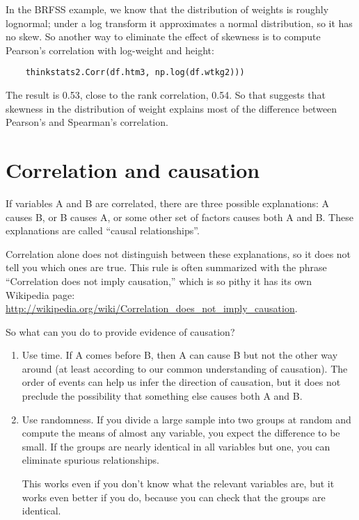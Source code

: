 \documentclass[12pt]{book}
\begin{document}
In the BRFSS example, we know that the distribution of weights is
roughly lognormal; under a log transform it approximates a normal
distribution, so it has no skew.
So another way to eliminate the effect of skewness is to
compute Pearson's
correlation with log-weight and height:

\begin{verbatim}
    thinkstats2.Corr(df.htm3, np.log(df.wtkg2)))
\end{verbatim}

The result is 0.53, close to the rank correlation, 0.54.  So that
suggests that skewness in the distribution of weight explains most of
the difference between Pearson's and Spearman's correlation.


\section{Correlation and causation}

If variables A and B are correlated, there are three possible
explanations: A causes B, or B causes A, or some other set of factors
causes both A and B.  These explanations are called ``causal
relationships''.

Correlation alone does not distinguish between these explanations,
so it does not tell you which ones are true.
This rule is often summarized with the phrase ``Correlation
does not imply causation,'' which is so pithy it has its own
Wikipedia page: \url{http://wikipedia.org/wiki/Correlation_does_not_imply_causation}.

So what can you do to provide evidence of causation?

\begin{enumerate}

\item Use time.  If A comes before B, then A can cause B but not the
  other way around (at least according to our common understanding of
  causation).  The order of events can help us infer the direction
  of causation, but it does not preclude the possibility that something
  else causes both A and B.

\item Use randomness.  If you divide a large sample into two
  groups at random and compute the means of almost any variable, you
  expect the difference to be small.
  If the groups are nearly identical in all variables but one, you
  can eliminate spurious relationships.

  This works even if you don't know what the relevant variables
  are, but it works even better if you do, because you can check that
  the groups are identical.

\end{enumerate}
\end{document}
